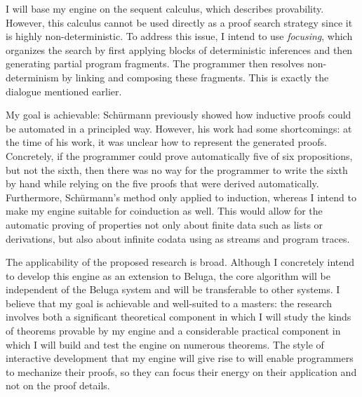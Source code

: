 \documentclass[12pt,letterpaper]{article}
\begin{document}
% 
I will base my engine on the sequent calculus, which describes provability.
However, this calculus cannot be used directly as a proof search strategy since
it is highly non-deterministic.
To address this issue, I intend to use \emph{focusing}, which organizes the
search by first applying blocks of deterministic inferences and then generating
partial program fragments.
The programmer then resolves non-determinism by linking and composing these
fragments. This is exactly the dialogue mentioned earlier.

My goal is achievable:
Schürmann\cite{schurmann-phd} previously showed how inductive proofs
could be automated in a principled way.
However, his work had some shortcomings: at the time of his work, it was
unclear how to represent the generated proofs.
Concretely, if the programmer could prove automatically five of six
propositions, but not the sixth, then there was no way for the programmer to
write the sixth by hand while relying on the five proofs that were derived
automatically.
Furthermore, Schürmann's method only applied to induction, whereas I intend to
make my engine suitable for coinduction as well. This would allow for the
automatic proving of properties not only about finite data such as lists or
derivations, but also about infinite codata using as streams and program
traces.

The applicability of the proposed research is broad.
Although I concretely intend to develop this engine as an extension to Beluga,
the core algorithm will be independent of the Beluga system and will be
transferable to other systems.
I believe that my goal is achievable and well-suited to a masters: the research
involves both a significant theoretical component in which I will study the
kinds of theorems provable by my engine and a considerable practical component
in which I will build and test the engine on numerous theorems.
The style of interactive development that my engine will give rise to will
enable programmers to mechanize their proofs, so they can focus their energy on
their application and not on the proof details.

\pagebreak
\printbibliography
\end{document}
